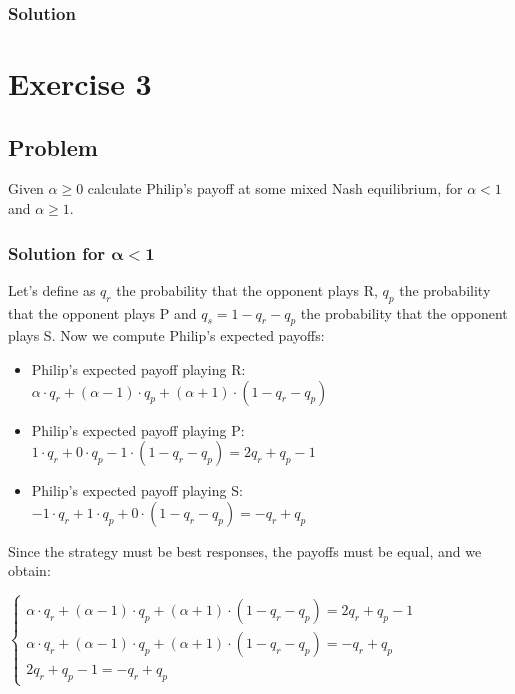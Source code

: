 \documentclass[11pt]{article}
\begin{document}
\subsubsection*{Solution}

\newpage

\section*{Exercise 3}
\subsection*{Problem}
Given $\alpha \ge 0$ calculate Philip’s payoff at some mixed Nash equilibrium, for $\alpha < 1$ and $\alpha \ge 1$.
\subsubsection*{Solution for $\mathbf{\alpha < 1}$}
Let's define as $q_r$ the probability that the opponent plays R, $q_p$ the probability that the opponent plays P and $q_s = 1 - q_r - q_p$ the probability that the opponent plays S. Now we compute Philip's expected payoffs:
\begin{itemize}
	\item Philip's expected payoff playing R: $\alpha \cdot q_r + (\alpha - 1) \cdot q_p + (\alpha + 1) \cdot (1 - q_r - q_p)$
	\item Philip's expected payoff playing P: $1 \cdot q_r + 0 \cdot q_p -1 \cdot (1 - q_r - q_p) = 2q_r + q_p - 1$
	\item Philip's expected payoff playing S: $-1 \cdot q_r + 1 \cdot q_p + 0 \cdot (1 - q_r - q_p) = -q_r + q_p$
\end{itemize}
Since the strategy must be best responses, the payoffs must be equal, and we obtain: \\
\begin{minipage}[t]{0.63\textwidth}
\(\left \{ \begin{array}{l}
\alpha \cdot q_r + (\alpha - 1) \cdot q_p + (\alpha + 1) \cdot (1 - q_r - q_p) = 2q_r + q_p - 1\\
\alpha \cdot q_r + (\alpha - 1) \cdot q_p + (\alpha + 1) \cdot (1 - q_r - q_p) = -q_r + q_p\\
2q_r + q_p - 1 = -q_r + q_p
\end{array}
\right. \)
\end{minipage}
\begin{minipage}[t]{0.07\textwidth}
	\raisebox{-.5\height}{\scalebox{2}{$\Rightarrow$}}
\end{minipage}
\end{document}
